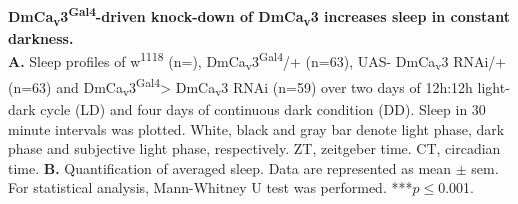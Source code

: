 \label{fig:S4}
\textbf{DmCa\textsubscript{v}3\textsuperscript{Gal4}-driven knock-down of DmCa\textsubscript{v}3 increases sleep in constant darkness.}
\\
\textbf{A.} Sleep profiles of w\textsuperscript{1118} (n=), DmCa\textsubscript{v}3\textsuperscript{Gal4}/+ (n=63), UAS- DmCa\textsubscript{v}3 RNAi/+ (n=63) and DmCa\textsubscript{v}3\textsuperscript{Gal4}> DmCa\textsubscript{v}3 RNAi (n=59) over two days of 12h:12h light-dark cycle (LD) and four days of continuous dark condition (DD).
Sleep in 30 minute intervals was plotted.
White, black and gray bar denote light phase, dark phase and subjective light phase, respectively.
ZT, zeitgeber time.
CT, circadian time.
\textbf{B.} Quantification of averaged sleep.
Data are represented as mean $\pm$ sem.
For statistical analysis, Mann-Whitney U test was performed.
***$p\le$0.001.